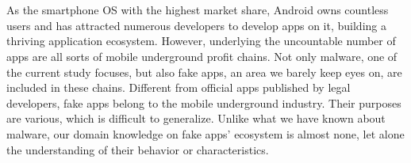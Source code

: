 \newpage


\chapter*{}
\vspace{-5mm}

As the smartphone OS with the highest market share, Android owns countless users and has attracted numerous developers to develop apps on it, building a thriving application ecosystem.
However, underlying the uncountable number of apps are all sorts of mobile underground profit chains.
Not only malware, one of the current study focuses, but also fake apps, an area we barely keep eyes on, are included in these chains.
Different from official apps published by legal developers, fake apps belong to the mobile underground industry.
Their purposes are various, which is difficult to generalize.
Unlike what we have known about malware, our domain knowledge on fake apps' ecosystem is almost none, let alone the understanding of their behavior or characteristics.

